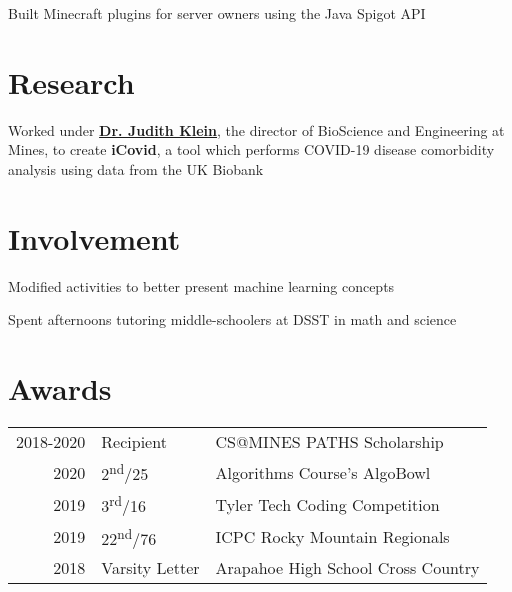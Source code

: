 \documentclass[]{darling-resume-openfont}
\begin{document}
\begin{minipage}[t]{0.66\textwidth}
\begin{tightemize}
\item Built Minecraft plugins for server owners using the Java Spigot API
\end{tightemize}
\sectionsep


\section{Research}
Worked under \textbf{\href{https://chemistry.mines.edu/project/klein-seetharaman-judith/}{Dr. Judith Klein}}, the director of BioScience and Engineering at Mines, to create \textbf{iCovid}, a tool which performs COVID-19 disease comorbidity analysis using data from the UK Biobank
\sectionsep


\section{Involvement}

\begin{tightemize}
\item Modified activities to better present machine learning concepts
\end{tightemize}
\sectionsep

\begin{tightemize}
\item Spent afternoons tutoring middle-schoolers at DSST in math and science
\end{tightemize}


\section{Awards}
\begin{tabular}{rll}
2018-2020 & Recipient & CS@MINES PATHS Scholarship \\
2020 & 2\textsuperscript{nd}/25 & Algorithms Course's AlgoBowl \\
2019 & 3\textsuperscript{rd}/16 & Tyler Tech Coding Competition \\
2019 & 22\textsuperscript{nd}/76 & ICPC Rocky Mountain Regionals \\
2018 & Varsity Letter & Arapahoe High School Cross Country \\
\end{tabular}
\sectionsep


\end{minipage} 
\end{document}
